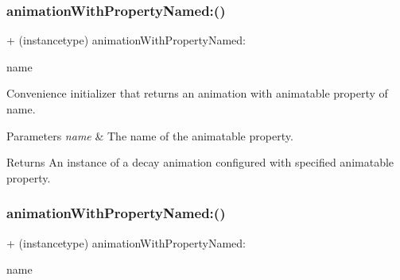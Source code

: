 \subsubsection{\texorpdfstring{animation\+With\+Property\+Named\+:()}{animationWithPropertyNamed:()}\hspace{0.1cm}{\footnotesize\ttfamily [1/3]}}
{\footnotesize\ttfamily + (instancetype) animation\+With\+Property\+Named\+: \begin{DoxyParamCaption}\item[{(N\+S\+String $\ast$)}]{name }\end{DoxyParamCaption}}

Convenience initializer that returns an animation with animatable property of name. 
\begin{DoxyParams}{Parameters}
{\em name} & The name of the animatable property. \\
\hline
\end{DoxyParams}
\begin{DoxyReturn}{Returns}
An instance of a decay animation configured with specified animatable property. 
\end{DoxyReturn}
\mbox{\label{interface_p_o_p_decay_animation_a09e82d62096c9c7b2eb9aac51a565e6f}} 
\subsubsection{\texorpdfstring{animation\+With\+Property\+Named\+:()}{animationWithPropertyNamed:()}\hspace{0.1cm}{\footnotesize\ttfamily [2/3]}}
{\footnotesize\ttfamily + (instancetype) animation\+With\+Property\+Named\+: \begin{DoxyParamCaption}\item[{(N\+S\+String $\ast$)}]{name }\end{DoxyParamCaption}}

